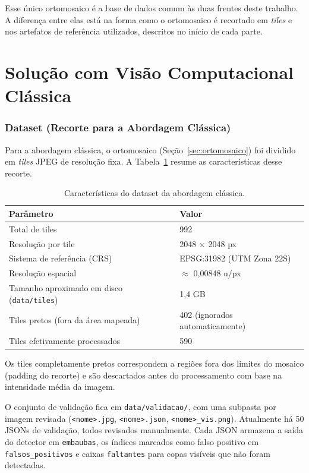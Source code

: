 \documentclass[12pt, a4paper]{article}
\begin{document}
Esse único ortomosaico é a base de dados comum às duas frentes deste trabalho. A
diferença entre elas está na forma como o ortomosaico é recortado em \textit{tiles}
e nos artefatos de referência utilizados, descritos no início de cada parte.

\part{Solução com Visão Computacional Clássica}

\section{Dataset (Recorte para a Abordagem Clássica)}
\label{sec:dataset-classico}

Para a abordagem clássica, o ortomosaico (Seção~\ref{sec:ortomosaico}) foi
dividido em \textit{tiles} JPEG de resolução fixa. A Tabela~\ref{tab:dataset}
resume as características desse recorte.

\begin{table}[H]
\centering
\caption{Características do dataset da abordagem clássica.}
\label{tab:dataset}
\begin{tabular}{ll}
\toprule
\textbf{Parâmetro} & \textbf{Valor} \\
\midrule
Total de tiles & 992 \\
Resolução por tile & 2048 $\times$ 2048 px \\
Sistema de referência (CRS) & EPSG:31982 (UTM Zona 22S) \\
Resolução espacial & $\approx$ 0,00848 u/px \\
Tamanho aproximado em disco (\texttt{data/tiles}) & 1,4 GB \\
Tiles pretos (fora da área mapeada) & 402 (ignorados automaticamente) \\
Tiles efetivamente processados & 590 \\
\bottomrule
\end{tabular}
\end{table}

Os tiles completamente pretos correspondem a regiões fora dos limites do mosaico
(padding do recorte) e são descartados antes do processamento com base na
intensidade média da imagem.

O conjunto de validação fica em \texttt{data/validacao/}, com uma subpasta por
imagem revisada (\texttt{<nome>.jpg}, \texttt{<nome>.json},
\texttt{<nome>\_vis.png}). Atualmente há 50 JSONs de validação, todos revisados
manualmente. Cada JSON armazena a saída do detector em \texttt{embaubas}, os
índices marcados como falso positivo em \texttt{falsos\_positivos} e caixas
\texttt{faltantes} para copas visíveis que não foram detectadas.
\end{document}
